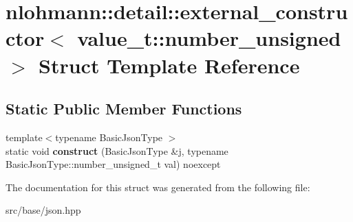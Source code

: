 \hypertarget{structnlohmann_1_1detail_1_1external__constructor_3_01value__t_1_1number__unsigned_01_4}{}\section{nlohmann\+:\+:detail\+:\+:external\+\_\+constructor$<$ value\+\_\+t\+:\+:number\+\_\+unsigned $>$ Struct Template Reference}
\label{structnlohmann_1_1detail_1_1external__constructor_3_01value__t_1_1number__unsigned_01_4}
\subsection*{Static Public Member Functions}
\begin{DoxyCompactItemize}
\item 
\mbox{\label{structnlohmann_1_1detail_1_1external__constructor_3_01value__t_1_1number__unsigned_01_4_a17969b14852f43e04353858c87b0f539}} 
{\footnotesize template$<$typename Basic\+Json\+Type $>$ }\\static void {\bfseries construct} (Basic\+Json\+Type \&j, typename Basic\+Json\+Type\+::number\+\_\+unsigned\+\_\+t val) noexcept
\end{DoxyCompactItemize}


The documentation for this struct was generated from the following file\+:\begin{DoxyCompactItemize}
\item 
src/base/json.\+hpp\end{DoxyCompactItemize}
